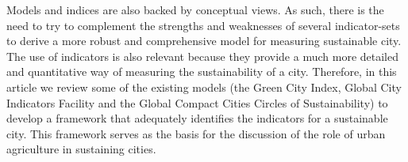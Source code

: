 Models and indices are also backed by conceptual views. As such, there is the need to try to complement the strengths and weaknesses of several indicator-sets to derive a more robust and comprehensive model for measuring sustainable city. The use of indicators is also relevant because they provide a much more detailed and quantitative way of measuring the sustainability of a city. Therefore, in this article we review some of the existing models (the Green City Index, Global City Indicators Facility and the Global Compact Cities Circles of Sustainability) to develop a framework that adequately identifies the indicators for a sustainable city. This framework serves as the basis for the discussion of the role of urban agriculture in sustaining cities.


